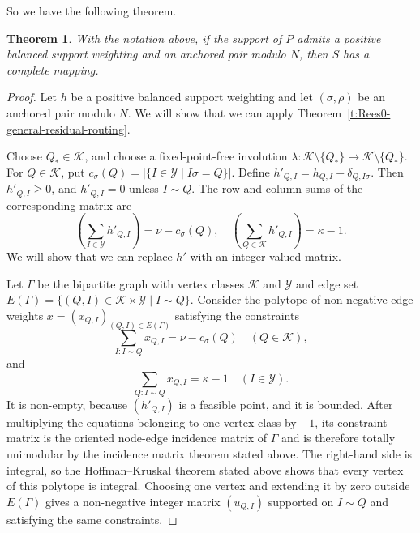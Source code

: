\documentclass[11pt]{article}
\theoremstyle{plain}
\newtheorem{theorem}{Theorem}[section]
\theoremstyle{remark}
\theoremstyle{definition}
\theoremstyle{plain}
\begin{document}
So we have the following theorem.

\begin{theorem}\label{t:Rees0-general-anchored}
With the notation above, if the support of $P$ admits a positive balanced
support weighting and an anchored pair modulo $N$, then $S$ has a complete
mapping.
\end{theorem}
\endgroup

\begin{proof}
Let $h$ be a positive balanced support weighting and let $(\sigma,\rho)$ be an anchored pair modulo $N$.
We will show that we can apply Theorem~\ref{t:Rees0-general-residual-routing}.

Choose $Q_\ast\in\mathcal K$, and choose a fixed-point-free involution
\(\lambda\colon \mathcal K\setminus\{Q_\ast\}\longrightarrow \mathcal K\setminus\{Q_\ast\}.\)
For $Q\in\mathcal K$, put
\(c_\sigma(Q)=|\{I\in\mathcal Y\mid I\sigma=Q\}|.\)
Define
\(h'_{Q,I}=h_{Q,I}-\delta_{Q,I\sigma}.\)
Then $h'_{Q,I}\ge0$, and $h'_{Q,I}=0$ unless $I\sim Q$. The row and column sums of the corresponding matrix are
\[
\left(\sum_{I\in\mathcal Y}h'_{Q,I}\right)=\nu-c_\sigma(Q),
        \quad
        \left(\sum_{Q\in\mathcal K}h'_{Q,I}\right)=\kappa-1.
\]
We will show that we can replace $h'$ with an integer-valued matrix.

Let $\Gamma$ be the bipartite graph with vertex classes $\mathcal K$ and
$\mathcal Y$ and edge set
\(E(\Gamma)=\{(Q,I)\in\mathcal K\times\mathcal Y\mid I\sim Q\}.\)
Consider the polytope of non-negative edge weights
$x=(x_{Q,I})_{(Q,I)\in E(\Gamma)}$ satisfying the constraints
\[
\sum_{I:I\sim Q}x_{Q,I}=\nu-c_\sigma(Q)
        \quad(Q\in\mathcal K),
\]
and
\[
\sum_{Q:I\sim Q}x_{Q,I}=\kappa-1
        \quad(I\in\mathcal Y).
\]
It is non-empty, because $(h'_{Q,I})$ is a feasible point, and it is bounded.
After multiplying the equations belonging to one vertex class by $-1$, its
constraint matrix is the oriented node-edge incidence matrix of $\Gamma$ and
is therefore totally unimodular by the incidence matrix theorem stated above.
The right-hand side is integral, so the Hoffman--Kruskal theorem stated above
shows that every vertex of this polytope is integral. Choosing one vertex and
extending it by zero outside $E(\Gamma)$ gives a non-negative integer matrix
$(u_{Q,I})$ supported on $I\sim Q$ and satisfying the same constraints.


\end{proof}
\end{document}
